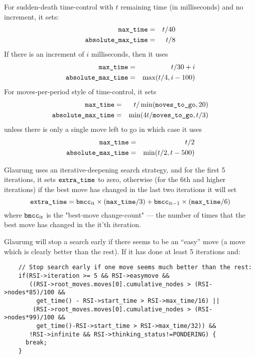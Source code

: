 \documentclass[10pt,dvipdfmx,letterpaper]{report}
\let\x=\times
\begin{document}
For sudden-death time-control with $t$ remaining time (in milliseconds)
and no increment, it sets:
\begin{eqnarray*}
\verb|max_time| &=& t/40 \\
\verb|absolute_max_time| &=& t/8
\end{eqnarray*}
If there is an increment of $i$ milliseconds, then it uses
\begin{eqnarray*}
\verb|max_time| &=& t/30+i \\
\verb|absolute_max_time| &=& \max(t/4,i-100)
\end{eqnarray*}
For moves-per-period style of time-control, it sets
\begin{eqnarray*}
\verb|max_time| &=& t/\min(\verb|moves_to_go|,20) \\
\verb|absolute_max_time| &=& \min(4t/\verb|moves_to_go|, t/3)
\end{eqnarray*}
unless there is only a single move left to go in which case it uses
\begin{eqnarray*}
\verb|max_time| &=& t/2 \\
\verb|absolute_max_time| &=& \min(t/2,t-500)
\end{eqnarray*}

Glaurung uses an iterative-deepening search strategy, and for
the first 5 iterations, it sets $\verb|extra_time|$ to zero,
otherwise (for the 6th and higher iterations) if the best move has changed
in the last two iterations it will set
\[ \verb|extra_time|
  = {\verb|bmcc|}_{\text{it}}\x(\verb|max_time|/3)
  + {\verb|bmcc|}_{\text{it}-1}\x(\verb|max_time|/6) \]
where ${\verb|bmcc|}_{\text{it}}$ is the "best-move change-count" --- the number
of times that the best move has changed in the $\text{it}$'th iteration.

Glaurung will stop a search early if there seems to be an ``easy'' move (a move
which is clearly better than the rest).  If it has done at least 5 iterations
and:
{\scriptsize
\begin{verbatim}
    // Stop search early if one move seems much better than the rest:
    if(RSI->iteration >= 5 && RSI->easymove &&
       ((RSI->root_moves.moves[0].cumulative_nodes > (RSI->nodes*85)/100 &&
         get_time() - RSI->start_time > RSI->max_time/16) ||
        (RSI->root_moves.moves[0].cumulative_nodes > (RSI->nodes*99)/100 && 
         get_time()-RSI->start_time > RSI->max_time/32)) &&
       !RSI->infinite && RSI->thinking_status!=PONDERING) {
      break;
    }
\end{verbatim}
}
\end{document}
